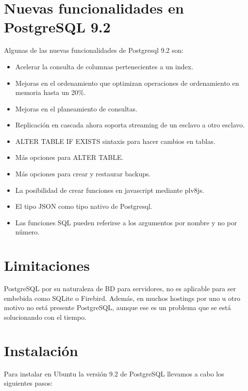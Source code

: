 \section{Nuevas funcionalidades en PostgreSQL 9.2}

Algunas de las nuevas funcionalidades de Postgresql 9.2 son: \cite{Obe2012}

\begin{itemize}
\item Acelerar la consulta de columnas pertenecientes a un index.
\item Mejoras en el ordenamiento que optimizan operaciones de ordenamiento en memoria hasta un 20\%.
\item Mejoras en el planeamiento de consultas.
\item Replicación en cascada ahora soporta streaming de un esclavo a otro esclavo.
\item ALTER TABLE IF EXISTS sintaxis para hacer cambios en tablas.
\item Más opciones para ALTER TABLE.
\item Más opciones para crear y restaurar backups.
\item La posibilidad de crear funciones en javascript mediante plv8js.
\item El tipo JSON como tipo nativo de Postgresql.
\item Las funciones SQL pueden referirse a los argumentos por nombre y no por número.

\end{itemize}

\section{Limitaciones}

PostgreSQL por su naturaleza de BD para servidores, no es aplicable para ser embebida como SQLite o Firebird. Además, en muchos hostings por uno u otro motivo no está presente PostgreSQL, aunque ese es un problema que se está solucionando con el tiempo.

\section{Instalación}

Para instalar en Ubuntu la versión 9.2 de PostgreSQL llevamos a cabo los siguientes pasos:

